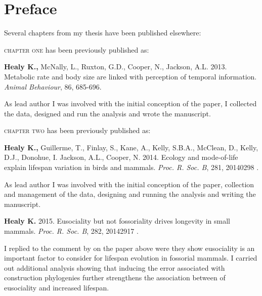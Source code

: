 \chapter*{Preface} %

Several chapters from my thesis have been published elsewhere:

\textsc{chapter one} has been previously published as:
%
\begin{previouspaper}
  \textbf{Healy K.,} McNally, L., Ruxton, G.D., Cooper, N., Jackson, A.L. 2013. Metabolic rate and body size are linked with perception of temporal information. \textit{Animal Behaviour}, 86, 685-696.
\end{previouspaper}
 
As lead author I was involved with the initial conception of the paper, I collected the data, designed and run the analysis and wrote the manuscript.


{}
\textsc{chapter two} has been previously published as:
%
\begin{previouspaper}
  \textbf{Healy K.,} Guillerme, T., Finlay, S., Kane, A., Kelly, S.B.A., McClean, D., Kelly, D.J., Donohue, I. Jackson, A.L., Cooper, N. 2014. Ecology and mode-of-life explain lifespan variation in birds and mammals. \textit{Proc. R. Soc. B}, 281, 20140298 .
\end{previouspaper}

As lead author I was involved with the initial conception of the paper, collection and management of the data, designing and running the analysis and writing the manuscript.

\begin{previouspaper}
  \textbf{Healy K.} 2015. Eusociality but not fossoriality drives longevity in small mammals. \textit{Proc. R. Soc. B}, 282, 20142917 .
\end{previouspaper}

I replied to the comment by \citep{williams2015ecology} on the paper above were they show eusociality is an important factor to consider for lifespan evolution in fossorial mammals. I carried out additional analysis showing that inducing the error associated with construction phylogenies further strengthens the association between of eusociality and increased lifespan.


